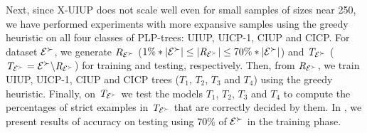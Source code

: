 Next, since X-UIUP does not scale well even for small samples of sizes near
250, we have performed experiments with more expansive samples using the greedy
heuristic on all four classes of PLP-trees: UIUP, UICP-1, CIUP and CICP.
For dataset $\mathcal{E}^\succ$, we generate $R_{\mathcal{E}^\succ}$ 
($1\%*|\mathcal{E}^\succ| \leq |\mathit{R}_{\mathcal{E}^\succ}| \leq 70\%*|\mathcal{E}^\succ|$)
and $\mathit{T}_{\mathcal{E}^\succ}$ ($\mathit{T}_{\mathcal{E}^\succ}=\mathcal{E}^\succ \backslash \mathit{R}_{\mathcal{E}^\succ}$) 
for training and testing, respectively.
Then, from $\mathit{R}_{\mathcal{E}^\succ}$, we train UIUP, UICP-1, CIUP and CICP trees
($T_1$, $T_2$, $T_3$ and $T_4$) using the greedy heuristic.
Finally, on $\mathit{T}_{\mathcal{E}^\succ}$ we test the models $T_1$, $T_2$, $T_3$ and $T_4$ to compute the percentages of 
strict examples in $\mathit{T}_{\mathcal{E}^\succ}$ that are correctly decided by them.
In , we present results of accuracy on testing using 70\% of $\mathcal{E}^\succ$
in the training phase.

